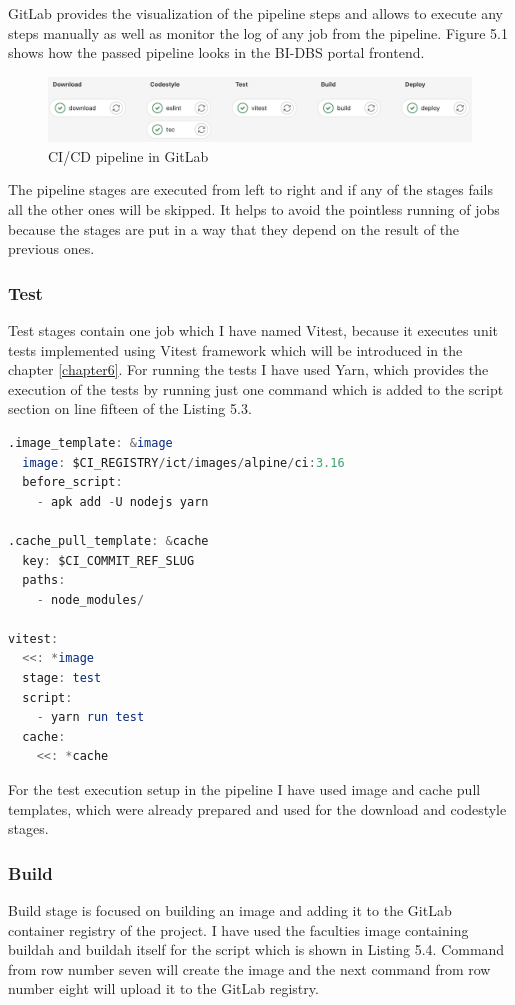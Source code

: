 \noindent GitLab provides the visualization of the pipeline steps and allows to execute any steps manually as well as monitor the log of any job from the pipeline. Figure 5.1 shows how the passed pipeline looks in the BI-DBS portal frontend.

\begin{figure}[ht]
\centering
\includegraphics[scale=0.377]{../png/pipeline.png}
\caption{CI/CD pipeline in GitLab}
\end{figure}

\noindent The pipeline stages are executed from left to right and if any of the stages fails all the other ones will be skipped. It helps to avoid the pointless running of jobs because the stages are put in a way that they depend on the result of the previous ones. 




\subsubsection{Test} Test stages contain one job which I have named Vitest, because it executes unit tests implemented using Vitest framework which will be introduced in the chapter \ref{chapter6}. For running the tests I have used Yarn, which provides the execution of the tests by running just one command which is added to the script section on line fifteen of the Listing 5.3. 
\begin{lstlisting}[language=Octave, caption=Test stage in the CI/CD pipeline]
.image_template: &image
  image: $CI_REGISTRY/ict/images/alpine/ci:3.16
  before_script:
    - apk add -U nodejs yarn

.cache_pull_template: &cache
  key: $CI_COMMIT_REF_SLUG
  paths:
    - node_modules/
    
vitest:
  <<: *image
  stage: test
  script:
    - yarn run test
  cache:
    <<: *cache

\end{lstlisting}

\noindent For the test execution setup in the pipeline I have used image and cache pull templates, which were already prepared and used for the download and codestyle stages.




\subsubsection{Build} Build stage is focused on building an image and adding it to the GitLab container registry of the project. I have used the faculties image containing buildah and buildah itself for the script which is shown in Listing 5.4. Command from row number seven will create the image and the next command from row number eight will upload it to the GitLab registry.\\

